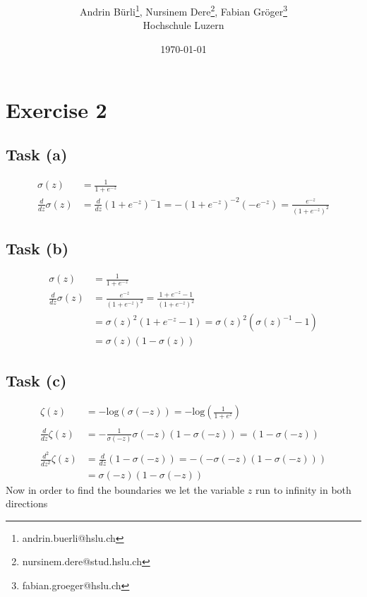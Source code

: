 \documentclass[onecolumn]{article}
\title{\spacecaps{Lab report: SW02}\\ \normalsize \spacesc{TSM\_DeLearn} }
\author{Andrin Bürli\thanks{andrin.buerli@hslu.ch}, Nursinem Dere\thanks{nursinem.dere@stud.hslu.ch}, Fabian Gröger\thanks{fabian.groeger@hslu.ch}\\Hochschule Luzern}
\date{\today}
\begin{document}
\maketitle

\section{Exercise 2}

\subsection{Task (a)}

\[
\begin{aligned}
	\sigma(z)&=\frac{1}{1+e^{-z}}\\
	\frac{d}{dz} \sigma(z) &= \frac{d}{dz}(1+e^{-z})^-1=-(1+e^{-z})^{-2}(-e^{-z})=\frac{e^{-z}}{(1+e^{-z})^{2}}
\end{aligned}
\]

\subsection{Task (b)}

\[
\begin{aligned}
	\sigma(z)&=\frac{1}{1+e^{-z}} \\
	\frac{d}{dz} \sigma(z) &= \frac{e^{-z}}{(1+e^{-z})^{2}}=\frac{1+e^{-z}-1}{(1+e^{-z})^{2}} \\
	&=\sigma(z)^2(1+e^{-z}-1)=\sigma(z)^2(\sigma(z)^{-1}-1) \\
	&=\sigma(z)(1-\sigma(z))
\end{aligned}
\]

\subsection{Task (c)}

\[
\begin{aligned}
	\zeta(z)&=-\text{log}(\sigma(-z))=-\text{log}\left(\frac{1}{1+e^z}\right)\\
	\\
	\frac{d}{dz} \zeta(z) &= -\frac{1}{\sigma(-z)} \sigma(-z)(1-\sigma(-z)) = (1-\sigma(-z)) \\
	\\
	\frac{d^2}{dz^2} \zeta(z) &=\frac{d}{dz} (1-\sigma(-z))=-(-\sigma(-z)(1-\sigma(-z)))\\
	&=\sigma(-z)(1-\sigma(-z))
\end{aligned}
\]
Now in order to find the boundaries we let the variable $z$ run to infinity in both directions
\end{document}
